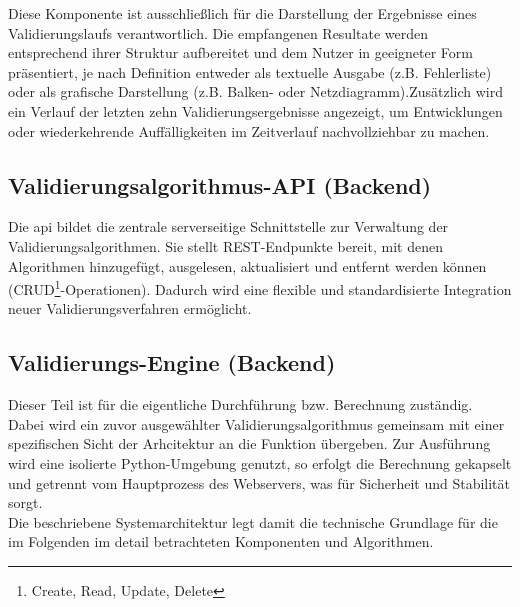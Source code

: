 Diese Komponente ist ausschließlich für die Darstellung der Ergebnisse eines Validierungslaufs verantwortlich. Die empfangenen Resultate werden entsprechend ihrer Struktur aufbereitet und dem Nutzer in geeigneter Form präsentiert, je nach Definition entweder als textuelle Ausgabe (z.B. Fehlerliste) oder als grafische Darstellung (z.B. Balken- oder Netzdiagramm).Zusätzlich wird ein Verlauf der letzten zehn Validierungsergebnisse angezeigt, um Entwicklungen oder wiederkehrende Auffälligkeiten im Zeitverlauf nachvollziehbar zu machen.

\subsection*{Validierungsalgorithmus-API (Backend)}

Die \gls{api} bildet die zentrale serverseitige Schnittstelle zur Verwaltung der Validierungsalgorithmen. Sie stellt REST-Endpunkte bereit, mit denen Algorithmen hinzugefügt, ausgelesen, aktualisiert und entfernt werden können (CRUD\footnote{Create, Read, Update, Delete}-Operationen). Dadurch wird eine flexible und standardisierte Integration neuer Validierungsverfahren ermöglicht.

\subsection*{Validierungs-Engine (Backend)}

Dieser Teil ist für die eigentliche Durchführung bzw. Berechnung zuständig. Dabei wird ein zuvor ausgewählter Validierungsalgorithmus gemeinsam mit einer spezifischen Sicht der Arhcitektur an die Funktion übergeben. Zur Ausführung wird eine isolierte Python-Umgebung genutzt, so erfolgt die Berechnung gekapselt und getrennt vom Hauptprozess des Webservers, was für Sicherheit und Stabilität sorgt.\\


Die beschriebene Systemarchitektur legt damit die technische Grundlage für die im Folgenden im detail betrachteten Komponenten und Algorithmen.



